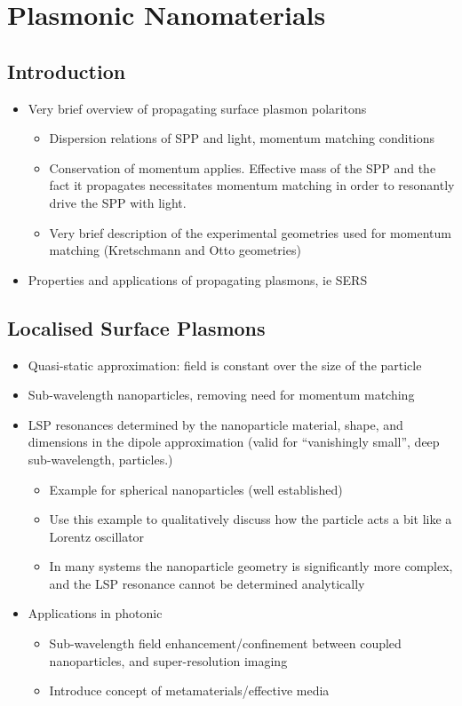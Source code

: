 \chapter{Plasmonic Nanomaterials}\label{sec:background:Plasmonics}

\section{Introduction}
\begin{itemize}
    \item Very brief overview of propagating surface plasmon polaritons
    \begin{itemize}
        \item Dispersion relations of SPP and light, momentum matching conditions
        \item Conservation of momentum applies. Effective mass of the SPP and the fact it propagates necessitates momentum matching in order to resonantly drive the SPP with light.
        \item Very brief description of the experimental geometries used for momentum matching (Kretschmann and Otto geometries)
    \end{itemize}
    \item Properties and applications of propagating plasmons, ie SERS
\end{itemize}

\section{Localised Surface Plasmons}\label{sec:background:Plasmonics:Metamaterials}
\begin{itemize}
    \item Quasi-static approximation: field is constant over the size of the particle
    \item Sub-wavelength nanoparticles, removing need for momentum matching
    \item LSP resonances determined by the nanoparticle material, shape, and dimensions in the dipole approximation (valid for ``vanishingly small'', deep sub-wavelength, particles.)
    \begin{itemize}
        \item Example for spherical nanoparticles (well established)
        \item Use this example to qualitatively discuss how the particle acts a bit like a Lorentz oscillator
        \item In many systems the nanoparticle geometry is significantly more complex, and the LSP resonance cannot be determined analytically
    \end{itemize}
    \item Applications in photonic
    \begin{itemize}
        \item Sub-wavelength field enhancement/confinement between coupled nanoparticles, and super-resolution imaging
        \item Introduce concept of metamaterials/effective media
    \end{itemize}
\end{itemize}

